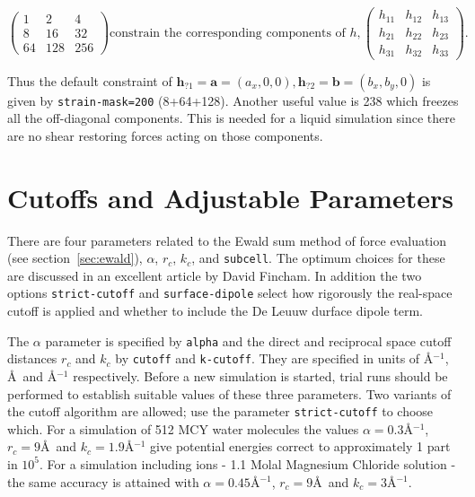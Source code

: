 \begin{displaymath}
\left (
\begin{array}{rrr}
1 & 2 & 4 \\ 8 & 16 & 32 \\ 64 & 128 & 256
\end{array}
\right )
\mbox{constrain the corresponding components of }
h, 
\left (
\begin{array}{rrr}
h_{11} & h_{12} & h_{13} \\ h_{21} & h_{22} & h_{23} \\ h_{31} & h_{32} & h_{33}
\end{array}
\right ).
\end{displaymath}

Thus the default constraint of $\bm{h}_{?1} = \bm{a} = (a_x,0,0),
\bm{h}_{?2} = \bm{b} = (b_x,b_y,0)$ is given by \verb'strain-mask=200'
(8+64+128).  Another useful value is 238 which freezes all the
off-diagonal components.  This is needed for a liquid simulation since
there are no shear restoring forces acting on those components.

\section{Cutoffs and Adjustable Parameters}%

There are four parameters related to the Ewald sum method of force
evaluation (see section~\ref{sec:ewald}), $\alpha$, $r_c$, $k_c$, and
\verb'subcell'.  The optimum choices for these are discussed in an
excellent article by David Fincham\cite{fincham:93}.  In addition
the two options \verb'strict-cutoff' and \verb'surface-dipole' select
how rigorously the real-space cutoff is applied and whether to include
the De Leuuw durface dipole term.

The $\alpha$ parameter is specified by \verb'alpha' and the direct and
reciprocal space cutoff distances $r_{c}$ and $k_{c}$ by \verb'cutoff'
and \verb'k-cutoff'.  They are specified in units of \AA$^{-1}$, \AA\ and
\AA$^{-1}$ respectively.  Before a new simulation is started, trial
runs should be performed to establish suitable values of these three
parameters.  Two variants of the cutoff algorithm are allowed; use the
parameter \verb'strict-cutoff' to choose which.  For a simulation of
512 MCY water molecules the values $\alpha = 0.3$\AA$^{-1}$, $r_{c} =
9$\AA\ and $k_{c} = 1.9$\AA$^{-1}$ give potential energies correct to
approximately 1 part in $10^{5}$. For a simulation including ions -
1.1 Molal Magnesium Chloride solution - the same accuracy is attained
with $\alpha = 0.45$\AA$^{-1}$, $r_{c} = 9$\AA\ and $k_{c} =
3$\AA$^{-1}$.

